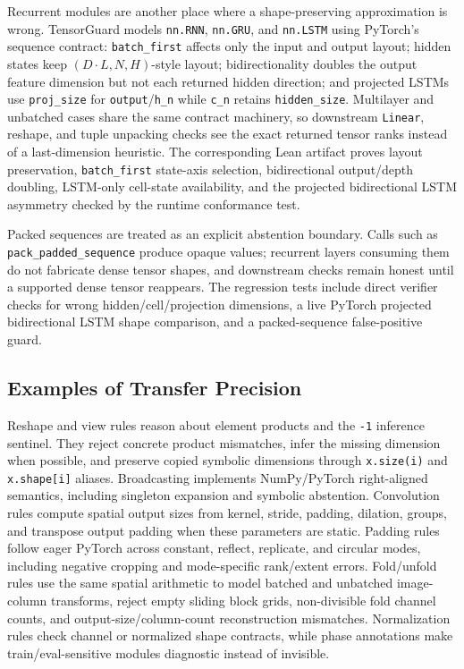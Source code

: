 \documentclass[11pt]{article}
\newcommand{\tg}{TensorGuard}
\begin{document}
Recurrent modules are another place where a shape-preserving approximation is
wrong.  \tg{} models \texttt{nn.RNN}, \texttt{nn.GRU}, and \texttt{nn.LSTM}
using PyTorch's sequence contract: \texttt{batch\_first} affects only the input
and output layout; hidden states keep \((D\cdot L,N,H)\)-style layout; bidirectionality
doubles the output feature dimension but not each returned hidden direction; and
projected LSTMs use \texttt{proj\_size} for \texttt{output}/\texttt{h\_n} while
\texttt{c\_n} retains \texttt{hidden\_size}.  Multilayer and unbatched cases share
the same contract machinery, so downstream \texttt{Linear}, reshape, and tuple
unpacking checks see the exact returned tensor ranks instead of a last-dimension
heuristic.
The corresponding Lean artifact proves layout preservation, \texttt{batch\_first}
state-axis selection, bidirectional output/depth doubling, LSTM-only cell-state
availability, and the projected bidirectional LSTM asymmetry checked by the
runtime conformance test.

Packed sequences are treated as an explicit abstention boundary.  Calls such as
\texttt{pack\_padded\_sequence} produce opaque values; recurrent layers consuming
them do not fabricate dense tensor shapes, and downstream checks remain honest
until a supported dense tensor reappears.  The regression tests include direct
verifier checks for wrong hidden/cell/projection dimensions, a live PyTorch
projected bidirectional LSTM shape comparison, and a packed-sequence false-positive
guard.

\subsection{Examples of Transfer Precision}

Reshape and view rules reason about element products and the \texttt{-1}
inference sentinel.  They reject concrete product mismatches, infer the missing
dimension when possible, and preserve copied symbolic dimensions through
\texttt{x.size(i)} and \texttt{x.shape[i]} aliases.  Broadcasting implements
NumPy/PyTorch right-aligned semantics, including singleton expansion and
symbolic abstention.  Convolution rules compute spatial output sizes from
kernel, stride, padding, dilation, groups, and transpose output padding when
these parameters are static.  Padding rules follow eager PyTorch across
constant, reflect, replicate, and circular modes, including negative cropping and
mode-specific rank/extent errors.  Fold/unfold rules use the same spatial arithmetic
to model batched and unbatched image-column transforms, reject empty sliding
block grids, non-divisible fold channel counts, and output-size/column-count
reconstruction mismatches.  Normalization rules check channel or normalized shape
contracts, while phase annotations make train/eval-sensitive modules diagnostic
instead of invisible.
\end{document}
